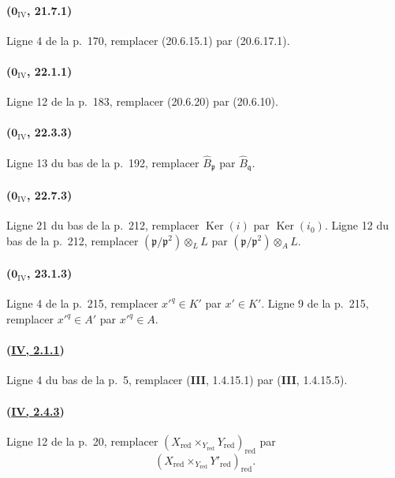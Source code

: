 \paragraph{($\mathbf{0}_{\mathrm{IV}}$, 21.7.1)}
Ligne 4 de la p.~170, remplacer (20.6.15.1) par (20.6.17.1).

\paragraph{($\mathbf{0}_{\mathrm{IV}}$, 22.1.1)}
Ligne 12 de la p.~183, remplacer (20.6.20) par (20.6.10).

\paragraph{($\mathbf{0}_{\mathrm{IV}}$, 22.3.3)}
Ligne 13 du bas de la p.~192, remplacer $\widehat B_{\mathfrak p}$ par
$\widehat B_{\mathfrak q}$.

\paragraph{($\mathbf{0}_{\mathrm{IV}}$, 22.7.3)}
Ligne 21 du bas de la p.~212, remplacer $\operatorname{Ker}(i)$ par
$\operatorname{Ker}(i_0)$. Ligne 12 du bas de la p.~212, remplacer
$(\mathfrak p/\mathfrak p^2)\otimes_L L$ par
$(\mathfrak p/\mathfrak p^2)\otimes_A L$.

\paragraph{($\mathbf{0}_{\mathrm{IV}}$, 23.1.3)}
Ligne 4 de la p.~215, remplacer $x'^q\in K'$ par $x'\in K'$. Ligne 9
de la p.~215, remplacer $x'^q\in A'$ par $x'^q\in A$.

\paragraph{({\texorpdfstring{\protect\hyperref[canon-index.ega4.c04.statement.2-1-1]{IV, 2.1.1}}{IV, 2.1.1}})}
Ligne 4 du bas de la p.~5, remplacer (\textbf{III}, 1.4.15.1) par
(\textbf{III}, 1.4.15.5).

\paragraph{({\texorpdfstring{\protect\hyperref[canon-index.ega4.c04.prop.2-4-3]{IV, 2.4.3}}{IV, 2.4.3}})}
Ligne 12 de la p.~20, remplacer
$(X_{\mathrm{red}}\times_{Y_{\mathrm{red}}}Y_{\mathrm{red}})_{\mathrm{red}}$
par
\[
(X_{\mathrm{red}}\times_{Y_{\mathrm{red}}}Y'_{\mathrm{red}})_{\mathrm{red}}.
\]


